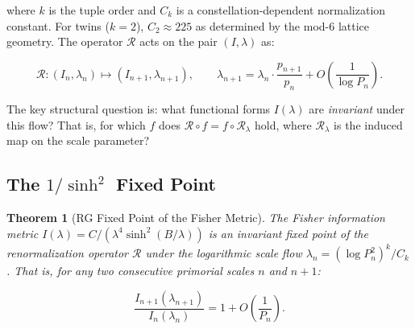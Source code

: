 \documentclass[11pt]{article}
\newtheorem{theorem}{Theorem}[section]
\theoremstyle{remark}
\begin{document}
where $k$ is the tuple order and $C_k$ is a constellation-dependent
normalization constant. For twins ($k=2$), $C_2 \approx 225$ as
determined by the mod-6 lattice geometry. The operator $\mathcal{R}$
acts on the pair $(I, \lambda)$ as:

\begin{equation}
\mathcal{R} : (I_n, \lambda_n) \mapsto (I_{n+1}, \lambda_{n+1}),
\qquad \lambda_{n+1} = \lambda_n \cdot \frac{p_{n+1}}{p_n} + O\left(\frac{1}{\log P_n}\right).
\end{equation}

The key structural question is: what functional forms $I(\lambda)$ are
\emph{invariant} under this flow? That is, for which $f$ does
$\mathcal{R} \circ f = f \circ \mathcal{R}_\lambda$ hold, where
$\mathcal{R}_\lambda$ is the induced map on the scale parameter?

\subsection{The $1/\sinh^2$ Fixed Point}

\begin{theorem}[RG Fixed Point of the Fisher Metric]
\label{thm:rg-fixed-point}
The Fisher information metric $I(\lambda) = C/(\lambda^4 \sinh^2(B/\lambda))$
is an invariant fixed point of the renormalization operator $\mathcal{R}$
under the logarithmic scale flow $\lambda_n = (\log P_n^2)^k / C_k$.
That is, for any two consecutive primorial scales $n$ and $n+1$:

\begin{equation}
\frac{I_{n+1}(\lambda_{n+1})}{I_n(\lambda_n)} = 1 + O\left(\frac{1}{P_n}\right).
\end{equation}
\end{theorem}
\end{document}
